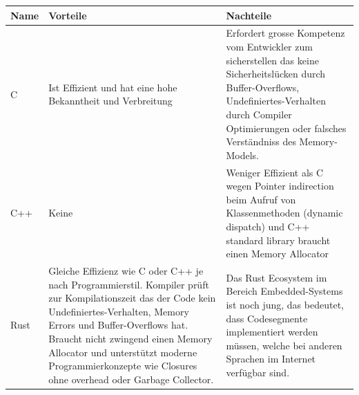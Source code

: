 \documentclass[a4paper]{report}
\begin{document}
\vspace{1em}
\noindent
\begin{tabular}{|p{}|p{}|p{}|}
  \hline
  \textbf{Name} & \textbf{Vorteile} & \textbf{Nachteile} \\
  \hline
  C & Ist Effizient und hat eine hohe Bekanntheit und Verbreitung & Erfordert grosse Kompetenz vom Entwickler zum sicherstellen das keine Sicherheitslücken durch Buffer-Overflows, Undefiniertes-Verhalten durch Compiler Optimierungen oder falsches Verständniss des Memory-Models. \\
  \hline
  C++ & Keine & Weniger Effizient als C wegen Pointer indirection beim Aufruf von Klassenmethoden (dynamic dispatch) und C++ standard library braucht einen Memory Allocator \\
  \hline
  Rust & Gleiche Effizienz wie C oder C++ je nach Programmierstil. Kompiler prüft zur Kompilationszeit das der Code kein Undefiniertes-Verhalten, Memory Errors und Buffer-Overflows hat. Braucht nicht zwingend einen Memory Allocator und unterstützt moderne Programmierkonzepte wie Closures ohne overhead oder Garbage Collector. & Das Rust Ecosystem im Bereich Embedded-Systems ist noch jung, das bedeutet, dass Codesegmente implementiert werden müssen, welche bei anderen Sprachen im Internet verfügbar sind.\\
  \hline
\end{tabular}
\end{document}

